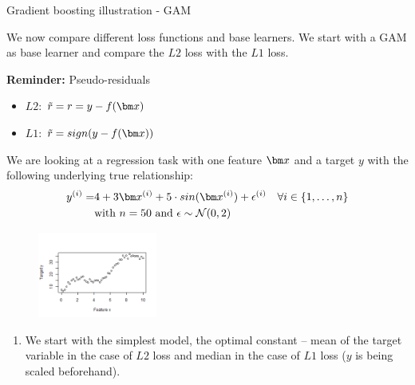 












\begin{vbframe}{Gradient boosting illustration - GAM}

We now compare different loss functions and base learners.
We start with a GAM as base learner and compare the $L2$ loss with
the $L1$ loss.\\
\vspace*{0.1cm}

\textbf{Reminder:} Pseudo-residuals
\begin{itemize}
\item $L2$: $\tilde{r} = r = y - f(\xv)$
\item $L1$: $\tilde{r} = sign(y - f(\xv))$
\end{itemize}
We are looking at a regression task with one feature $\xv$ and a target $y$ with the following
underlying true relationship:
\vspace{-0.2cm}
\begin{align*}
y^{(i)} = & 4 + 3\xv^{(i)} + 5 \cdot sin(\xv^{(i)}) + \epsilon^{(i)} \quad \forall i \in \nset\\
&\text{with } n = 50 \text{ and } \epsilon \sim \mathcal{N}(0,2)
\end{align*}

\vspace{-0.3cm}
\begin{figure}
  \includegraphics[width=0.35\textwidth]{figure_man/illustration_data_normal.png}
\end{figure}

\framebreak
\begin{enumerate}

  \item
    We start with the simplest model, the optimal constant -- mean of the target variable in the case of $L2$ loss and median in the case of $L1$ loss ($y$ is being scaled beforehand).


\end{enumerate}
\end{vbframe}
